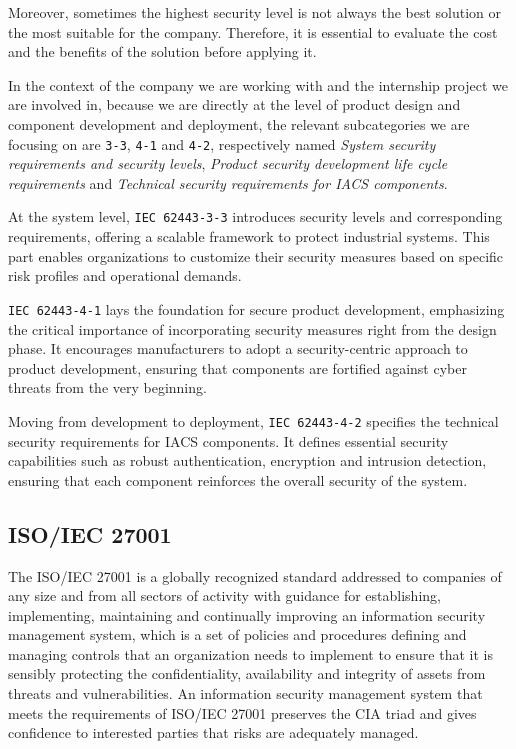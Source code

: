 Moreover, sometimes the highest security level is not always the best solution or the most suitable for the company. Therefore, it is essential to evaluate the cost and the benefits of the solution before applying it.


In the context of the company we are working with and the internship project we are involved in, because we are directly at the level of product design and component development and deployment, the relevant subcategories we are focusing on are \texttt{3-3}, \texttt{4-1} and \texttt{4-2}, respectively named \textit{System security requirements and security levels}, \textit{Product security development life cycle requirements} and \textit{Technical security requirements for IACS components}.

At the system level, \texttt{IEC 62443-3-3} introduces security levels and corresponding requirements, offering a scalable framework to protect industrial systems. This part enables organizations to customize their security measures based on specific risk profiles and operational demands.

\texttt{IEC 62443-4-1} lays the foundation for secure product development, emphasizing the critical importance of incorporating security measures right from the design phase. It encourages manufacturers to adopt a security-centric approach to product development, ensuring that components are fortified against cyber threats from the very beginning.

Moving from development to deployment, \texttt{IEC 62443-4-2} specifies the technical security requirements for IACS components. It defines essential security capabilities such as robust authentication, encryption and intrusion detection, ensuring that each component reinforces the overall security of the system.~\cite{iec-62443-safeguarding-industrial-automation-linkedin}


\subsection{ISO/IEC 27001}

The ISO/IEC 27001 is a globally recognized standard addressed to companies of any size and from all sectors of activity with guidance for establishing, implementing, maintaining and continually improving an information security management system, which is a set of policies and procedures defining and managing controls that an organization needs to implement to ensure that it is sensibly protecting the confidentiality, availability and integrity of assets from threats and vulnerabilities. An information security management system that meets the requirements of ISO/IEC 27001 preserves the CIA triad and gives confidence to interested parties that risks are adequately managed.

